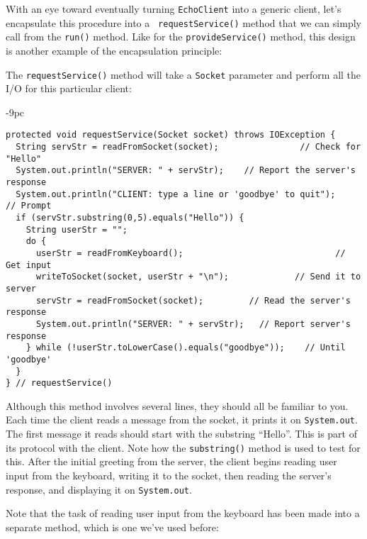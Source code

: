 {\noindent With an eye toward eventually turning {\tt EchoClient} into
a generic client, let's encapsulate this procedure into a {\tt
requestService()} method that we can simply call from the {\tt run()}
method.  Like for the {\tt provideService()} method, this design is
another example of the encapsulation principle:


\noindent The {\tt requestService()} method will take a {\tt Socket}
parameter and perform all the I/O for this particular client:

\begin{jjjlistingleft}[35pc]{-9pc}
\begin{lstlisting}
protected void requestService(Socket socket) throws IOException {
  String servStr = readFromSocket(socket);                // Check for "Hello"
  System.out.println("SERVER: " + servStr);    // Report the server's response
  System.out.println("CLIENT: type a line or 'goodbye' to quit");    // Prompt
  if (servStr.substring(0,5).equals("Hello")) {
    String userStr = "";
    do {
      userStr = readFromKeyboard();                              // Get input
      writeToSocket(socket, userStr + "\n");             // Send it to server
      servStr = readFromSocket(socket);         // Read the server's response
      System.out.println("SERVER: " + servStr);   // Report server's response
    } while (!userStr.toLowerCase().equals("goodbye"));    // Until 'goodbye'
  }
} // requestService()
\end{lstlisting}
\end{jjjlistingleft}

\noindent Although this method involves several lines, they should
all be familiar to you.  Each time the client reads a message from the
socket, it prints it on {\tt System.out}. The first message it reads
should start with the substring ``Hello''. This is part of its
protocol with the client.  Note how the {\tt substring()} method is
used to test for this.  After the initial greeting from the server, the
client begins reading user input from the keyboard, writing it to the
socket, then reading the server's response, and displaying it on
{\tt System.out}.

Note that the task of reading user input from the keyboard has been
made into a separate method, which is one we've used before:

}
